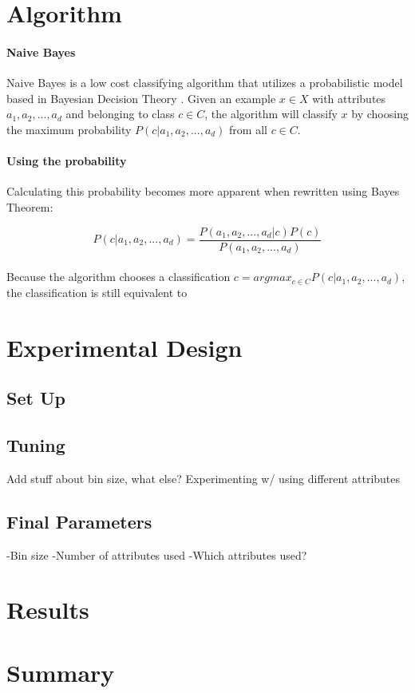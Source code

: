 \documentclass[twoside,11pt]{article}
\begin{document}
\section{Algorithm}

\paragraph{Naive Bayes}Naive Bayes is a low cost classifying algorithm that utilizes a probabilistic model based in Bayesian Decision Theory \citep{nbPaper:2014}. Given an example $x \in X$ with attributes $a_1, a_2, ..., a_d$ and belonging to class $c \in C$, the algorithm will classify $x$ by choosing the maximum probability $P(c|a_1, a_2, ..., a_d)$ from all $c \in C$.

\paragraph{Using the probability}Calculating this probability becomes more apparent when rewritten using Bayes Theorem:

$$P(c|a_1, a_2, ..., a_d) = \frac{P(a_1, a_2, ..., a_d | c)P(c)}{P(a_1, a_2, ..., a_d)} $$

\paragraph{} Because the algorithm chooses a classification $c = argmax_{c \in C}P(c|a_1, a_2, ..., a_d)$, the classification is still equivalent to

\section{Experimental Design}

\subsection{Set Up}


\subsection{Tuning}

Add stuff about bin size, what else? \newline
Experimenting w/ using different attributes

\subsection{Final Parameters}

-Bin size \newline
-Number of attributes used \newline
-Which attributes used? \newline

\section{Results}

\section{Summary}


\end{document}
